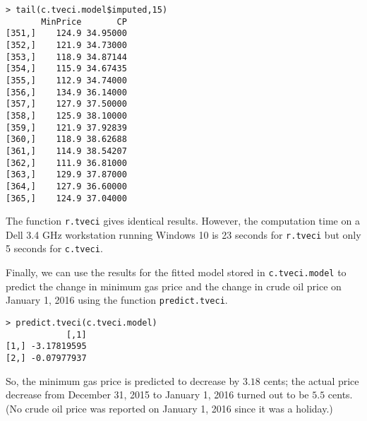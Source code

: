 \documentclass[12pt]{article}
\begin{document}
\begin{verbatim}
> tail(c.tveci.model$imputed,15)
       MinPrice       CP
[351,]    124.9 34.95000
[352,]    121.9 34.73000
[353,]    118.9 34.87144
[354,]    115.9 34.67435
[355,]    112.9 34.74000
[356,]    134.9 36.14000
[357,]    127.9 37.50000
[358,]    125.9 38.10000
[359,]    121.9 37.92839
[360,]    118.9 38.62688
[361,]    114.9 38.54207
[362,]    111.9 36.81000
[363,]    129.9 37.87000
[364,]    127.9 36.60000
[365,]    124.9 37.04000
\end{verbatim}
The function {\tt r.tveci} gives identical results.  However, the computation time on a Dell 3.4 GHz workstation running Windows 10 is 23 seconds for {\tt r.tveci} but only 5 seconds for {\tt c.tveci}.

Finally, we can use the results for the fitted model stored in {\tt c.tveci.model} to predict the change in minimum gas price and the change in crude oil price on January 1, 2016 using the function {\tt predict.tveci}.
\begin{verbatim}
> predict.tveci(c.tveci.model)
            [,1]
[1,] -3.17819595
[2,] -0.07977937
\end{verbatim}
So, the minimum gas price is predicted to decrease by $3.18$ cents; the actual price decrease from December 31, 2015 to January 1, 2016 turned out to be $5.5$ cents.  (No crude oil price was reported on January 1, 2016 since it was a holiday.)
\end{document}
